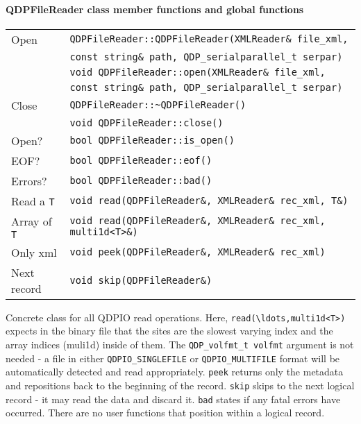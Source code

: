 \documentclass[12pt,letterpaper]{article}
\begin{document}
\paragraph{QDPFileReader class member functions and global functions}

\begin{flushleft}
  \begin{tabular}{|l|l|}
  \hline
  Open           & \verb|QDPFileReader::QDPFileReader(XMLReader& file_xml, |\\
                 & \qquad\verb|const string& path, QDP_serialparallel_t serpar)|\\
                 & \verb|void QDPFileReader::open(XMLReader& file_xml, |\\
                 & \qquad\verb|const string& path, QDP_serialparallel_t serpar)|\\
  \hline
  Close          & \verb|QDPFileReader::~QDPFileReader()|\\
                 & \verb|void QDPFileReader::close()|\\
  \hline
  Open?          & \verb|bool QDPFileReader::is_open()| \\
  \hline
  EOF?           & \verb|bool QDPFileReader::eof()| \\
  \hline
  Errors?        & \verb|bool QDPFileReader::bad()| \\
  \hline
  Read a \verb|T| & \verb|void read(QDPFileReader&, XMLReader& rec_xml, T&)| \\
  Array of \verb|T| & \verb|void read(QDPFileReader&, XMLReader& rec_xml, multi1d<T>&)| \\
  \hline
  Only xml & \verb|void peek(QDPFileReader&, XMLReader& rec_xml)| \\
  \hline
  Next record & \verb|void skip(QDPFileReader&)| \\
  \hline
 \end{tabular}
\end{flushleft}
%
Concrete class for all QDPIO read operations.  Here,
\verb|read(\ldots,multi1d<T>)| expects in the binary file that the
sites are the slowest varying index and the array indices (muli1d)
inside of them. The \verb|QDP_volfmt_t volfmt| argument is not needed -
a file in either \verb|QDPIO_SINGLEFILE| or \verb|QDPIO_MULTIFILE|
format will be automatically detected and read appropriately.
\verb|peek| returns only the metadata and repositions
back to the beginning of the record.  \verb|skip| skips to the next
logical record - it may read the data and discard it. \verb|bad|
states if any fatal errors have occurred. There are no user functions
that position within a logical record.
\end{document}
